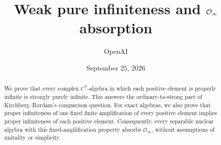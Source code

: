 \documentclass[11pt]{article}
\title{Weak pure infiniteness and \texorpdfstring{\(\Oinf\)}{O-infinity} absorption}
\author{OpenAI}
\date{September 25, 2026}
\newcommand{\Oinf}{\mathcal O_\infty}
\theoremstyle{plain}
\theoremstyle{definition}
\theoremstyle{remark}
\numberwithin{equation}{section}
\begin{document}
\maketitle

\begin{abstract}
We prove that every complex \(C^*\)-algebra in which each positive
element is properly infinite is strongly purely infinite. This answers
the ordinary-to-strong part of Kirchberg--R{\o}rdam's comparison question.
For exact algebras, we also prove that proper infiniteness of one fixed
finite amplification of every positive element implies proper infiniteness
of each positive element. Consequently, every separable nuclear algebra
with this fixed-amplification property absorbs \(\Oinf\), without
assumptions of unitality or simplicity.
\end{abstract}














\end{document}
